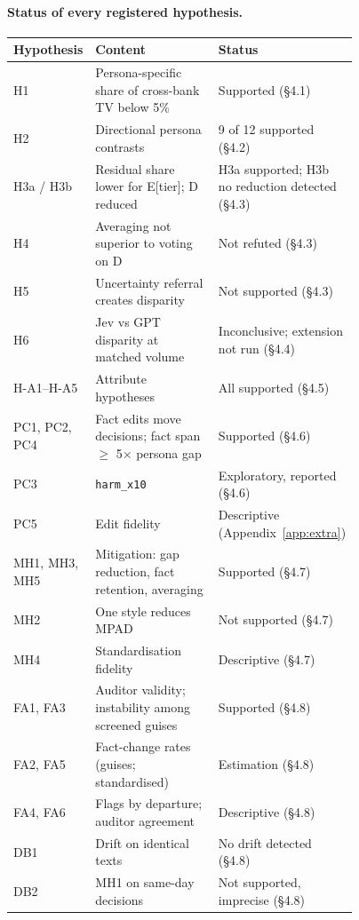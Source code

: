 \paragraph{Status of every registered hypothesis.}
\begin{center}\small\begin{tabular}{@{}lp{0.42\linewidth}p{0.35\linewidth}@{}}\toprule
Hypothesis & Content & Status \\
\midrule
H1 & Persona-specific share of cross-bank TV below 5\% & Supported (§4.1) \\
H2 & Directional persona contrasts & 9 of 12 supported (§4.2) \\
H3a / H3b & Residual share lower for E[tier]; D reduced & H3a supported; H3b no reduction detected (§4.3) \\
H4 & Averaging not superior to voting on D & Not refuted (§4.3) \\
H5 & Uncertainty referral creates disparity & Not supported (§4.3) \\
H6 & Jev vs GPT disparity at matched volume & Inconclusive; extension not run (§4.4) \\
H-A1--H-A5 & Attribute hypotheses & All supported (§4.5) \\
PC1, PC2, PC4 & Fact edits move decisions; fact span $\ge$ 5× persona gap & Supported (§4.6) \\
PC3 & \texttt{harm\_x10} & Exploratory, reported (§4.6) \\
PC5 & Edit fidelity & Descriptive (Appendix~\ref{app:extra}) \\
MH1, MH3, MH5 & Mitigation: gap reduction, fact retention, averaging & Supported (§4.7) \\
MH2 & One style reduces MPAD & Not supported (§4.7) \\
MH4 & Standardisation fidelity & Descriptive (§4.7) \\
FA1, FA3 & Auditor validity; instability among screened guises & Supported (§4.8) \\
FA2, FA5 & Fact-change rates (guises; standardised) & Estimation (§4.8) \\
FA4, FA6 & Flags by departure; auditor agreement & Descriptive (§4.8) \\
DB1 & Drift on identical texts & No drift detected (§4.8) \\
DB2 & MH1 on same-day decisions & Not supported, imprecise (§4.8) \\
\bottomrule\end{tabular}\end{center}

